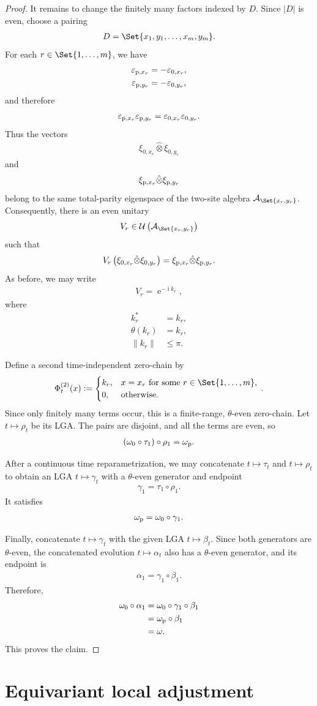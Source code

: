 \documentclass[a4paper,10pt]{article}
\numberwithin{equation}{section}
\theoremstyle{plain}
\theoremstyle{plain}
\theoremstyle{plain}
\theoremstyle{plain}
\theoremstyle{plain}
\theoremstyle{remark}
\theoremstyle{definition}
\newcommand{\ee}{\operatorname{e}}
\newcommand{\ii}{\operatorname{i}}
\newcommand{\calA}{\mathcal{A}}
\newcommand{\calU}{\mathcal{U}}
\newcommand\norm[1]{\left\lVert#1\right\rVert}
\newcommand{\ve}{\varepsilon}
\newcommand{\eq}[1]{\begin{align*}#1\end{align*}}
\newcommand{\eql}[1]{\begin{align}#1\end{align}}
\newcommand{\br}[1]{\left(#1\right)}
\begin{document}
\begin{proof}
It remains to change the finitely many factors indexed by $D$. Since
$\lvert D\rvert$ is even, choose a pairing
\eq{
D
=
\Set{
x_1,y_1,\ldots,x_m,y_m
}.
}
For each $r\in\Set{1,\ldots,m}$, we have
\eq{
\ve_{{\rm p},x_r}
&=
-\ve_{0,x_r},\\
\ve_{{\rm p},y_r}
&=
-\ve_{0,y_r},
}
and therefore
\eq{
\ve_{{\rm p},x_r}\ve_{{\rm p},y_r}
=
\ve_{0,x_r}\ve_{0,y_r}.
}
Thus the vectors
\eq{
\xi_{0,x_r}
\hat{\otimes}
\xi_{0,y_r}
}
and
\eq{
\xi_{{\rm p},x_r}
\hat{\otimes}
\xi_{{\rm p},y_r}
}
belong to the same total-parity eigenspace of the two-site algebra
$\calA_{\Set{x_r,y_r}}$. Consequently, there is an even unitary
\eq{
V_r
\in
\calU\br{
\calA_{\Set{x_r,y_r}}
}
}
such that
\eq{
V_r
\br{
\xi_{0,x_r}
\hat{\otimes}
\xi_{0,y_r}
}
=
\xi_{{\rm p},x_r}
\hat{\otimes}
\xi_{{\rm p},y_r}.
}
As before, we may write
\eq{
V_r
=
\ee^{-\ii k_r},
}
where
\eq{
k_r^\ast
&=
k_r,\\
\theta(k_r)
&=
k_r,\\
\norm{k_r}
&\leq
\pi.
}

Define a second time-independent zero-chain by
\eq{
\Phi^{(2)}_t(x)
:=
\begin{cases}
k_r,
&
x=x_r
\text{ for some }
r\in\Set{1,\ldots,m},\\
0,
&
\text{otherwise}.
\end{cases}\,.
}
Since only finitely many terms occur, this is a finite-range,
$\theta$-even zero-chain. Let $t\mapsto\rho_t$ be its LGA. The pairs are
disjoint, and all the terms are even, so
\eq{
\br{
\omega_0\circ\tau_1
}
\circ\rho_1
=
\omega_{\rm p}.
}

After a continuous time reparametrization, we may concatenate
$t\mapsto\tau_t$ and $t\mapsto\rho_t$ to obtain an LGA
$t\mapsto\gamma_t$ with a $\theta$-even generator and endpoint
\eq{
\gamma_1
=
\tau_1\circ\rho_1.
}
It satisfies
\eql{
\omega_{\rm p}
=
\omega_0\circ\gamma_1.
}

Finally, concatenate $t\mapsto\gamma_t$ with the given LGA
$t\mapsto\beta_t$. Since both generators are $\theta$-even, the
concatenated evolution $t\mapsto\alpha_t$ also has a $\theta$-even
generator, and its endpoint is
\eq{
\alpha_1
=
\gamma_1\circ\beta_1.
}
Therefore,
\eq{
\omega_0\circ\alpha_1
&=
\omega_0\circ\gamma_1\circ\beta_1\\
&=
\omega_{\rm p}\circ\beta_1\\
&=
\omega.
}
This proves the claim.
\end{proof}
\section{Equivariant local adjustment}
\label{app:equivariant local adjustment}
\end{document}
